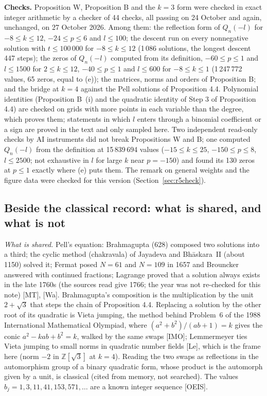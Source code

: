 \documentclass[11pt]{article}
\begin{document}
\medskip
\noindent\textbf{Checks.} Proposition W, Proposition B and the $k=3$ form were checked in exact integer arithmetic by a checker of 44 checks, all passing on 24 October and again, unchanged, on 27 October 2026. Among them: the reflection form of $Q_n(-l)$ for $-8\le k\le12$, $-24\le p\le6$ and $l\le100$; the descent run on every nonnegative solution with $t\le100\,000$ for $-8\le k\le12$ (1\,086 solutions, the longest descent 447 steps); the zeros of $Q_n(-l)$ computed from its definition, $-60\le p\le1$ and $l\le1500$ for $2\le k\le12$, $-40\le p\le1$ and $l\le600$ for $-8\le k\le1$ (1\,247\,772 values, 65 zeros, equal to (e)); the matrices, norms and orders of Proposition B; and the bridge at $k=4$ against the Pell solutions of Proposition 4.4. Polynomial identities (Proposition B~(i) and the quadratic identity of Step 3 of Proposition 4.4) are checked on grids with more points in each variable than the degree, which proves them; statements in which $l$ enters through a binomial coefficient or a sign are proved in the text and only sampled here. Two independent read-only checks by AI instruments did not break Propositions W and B; one computed $Q_n(-l)$ from the definition at 15\,839\,694 values ($-15\le k\le25$, $-150\le p\le8$, $l\le2500$; not exhaustive in $l$ for large $k$ near $p=-150$) and found its 130 zeros at $p\le1$ exactly where (e) puts them. The remark on general weights and the figure data were checked for this version (Section~\ref{sec:r5check}).

\subsection{Beside the classical record: what is shared, and what is not}\label{sec:classical}

\noindent\emph{What is shared.} Pell's equation: Brahmagupta (628) composed two solutions into a third; the cyclic method (chakravala) of Jayadeva and Bh\=askara~II (about 1150) solved it; Fermat posed $N=61$ and $N=109$ in 1657 and Brouncker answered with continued fractions; Lagrange proved that a solution always exists in the late 1760s (the sources read give 1766; the year was not re-checked for this note) [MT], [Wa]. Brahmagupta's composition is the multiplication by the unit $2+\sqrt3$ that steps the chain of Proposition 4.4. Replacing a solution by the other root of its quadratic is Vieta jumping, the method behind Problem~6 of the 1988 International Mathematical Olympiad, where $(a^2+b^2)/(ab+1)=k$ gives the conic $a^2-kab+b^2=k$, walked by the same swaps [IMO]; Lemmermeyer ties Vieta jumping to small norms in quadratic number fields [Le], which is the frame here (norm $-2$ in $\mathbb{Z}[\sqrt3]$ at $k=4$). Reading the two swaps as reflections in the automorphism group of a binary quadratic form, whose product is the automorph given by a unit, is classical (cited from memory, not searched). The values $b_j=1,3,11,41,153,571,\dots$ are a known integer sequence [OEIS].
\end{document}
